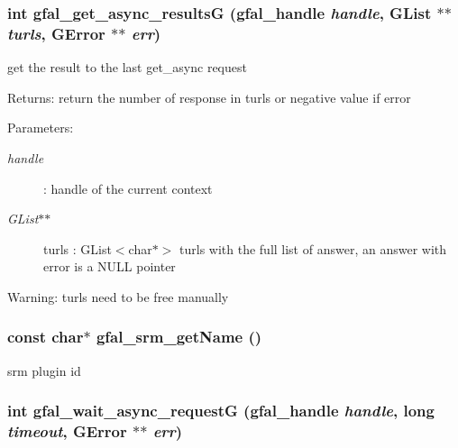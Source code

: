 \subsubsection{\setlength{\rightskip}{0pt plus 5cm}int gfal\_\-get\_\-async\_\-results\-G (gfal\_\-handle {\em handle}, GList $\ast$$\ast$ {\em turls}, GError $\ast$$\ast$ {\em err})}\label{gfal__common__srm_8h_1c3a2a23f764ce8bf5cdd73108e4d9ca}


get the result to the last get\_\-async request 

\begin{Desc}
\item[Returns:]return the number of response in turls or negative value if error \end{Desc}
\begin{Desc}
\item[Parameters:]
\begin{description}
\item[{\em handle}]: handle of the current context \item[{\em GList$\ast$$\ast$}]turls : GList$<$char$\ast$$>$ turls with the full list of answer, an answer with error is a NULL pointer \end{description}
\end{Desc}
\begin{Desc}
\item[Warning:]turls need to be free manually \end{Desc}
\subsubsection{\setlength{\rightskip}{0pt plus 5cm}const char$\ast$ gfal\_\-srm\_\-get\-Name ()}\label{gfal__common__srm_8h_9eaea5b630099808082807628bd08e5f}


srm plugin id 
\subsubsection{\setlength{\rightskip}{0pt plus 5cm}int gfal\_\-wait\_\-async\_\-request\-G (gfal\_\-handle {\em handle}, long {\em timeout}, GError $\ast$$\ast$ {\em err})}\label{gfal__common__srm_8h_86890a00f72d9af9ab88f42a69e3bf8c}



